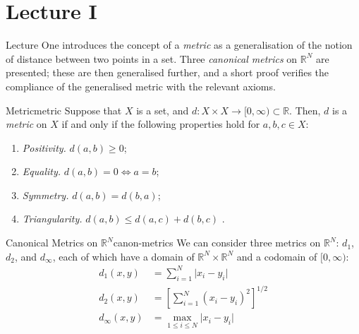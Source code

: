 \documentclass{article}
\numberwithin{equation}{section}
\numberwithin{enumi}{section}
\begin{document}
\section{Lecture I}
Lecture One introduces the concept of a \emph{metric} as a generalisation of the
notion of distance between two points in a set. Three \emph{canonical metrics}
on $\mathbb{R}^N$ are presented; these are then generalised further, and a short
proof verifies the compliance of the generalised metric with the relevant
axioms.
\begin{definition}{Metric}{metric}
    Suppose that $ X $ is a set, and $ d \colon X \times X \to [0, \infty)
    \subset \mathbb{R} $. Then, $ d $ is a \emph{metric} on $ X $ if and only if
    the following properties hold for $ a, b, c \in X $:
    \begin{enumerate}
        \item \emph{Positivity.} $ d(a, b) \geq 0 $;
        \item \emph{Equality.} $ d(a, b) = 0 \iff a = b $;
        \item \emph{Symmetry.} $ d(a, b) = d(b, a) $;
        \item \emph{Triangularity.} $ d(a, b) \leq d(a, c) + d(b, c) $
            \label{itm:triangle-inequality}.
    \end{enumerate}
\end{definition}
\begin{definition}{Canonical Metrics on \texorpdfstring{$\mathbb{R}^N$}{an
        N-dimensional real vector space}}{canon-metrics}
    We can consider three metrics on $ \mathbb{R}^N $: $ d_1 $, $ d_2 $, and
    $ d_\infty $, each of which have a domain of $ \mathbb{R}^N \times
    \mathbb{R}^N $ and a codomain of $ [0, \infty) $:
    \begin{align}
        d_1(x, y) &= \sum_{i=1}^N \vert x_i - y_i \vert \\
        d_2(x, y) &= \left[\sum_{i=1}^N (x_i - y_i)^2\right]^{1/2}
            \label{eqn:d2-metric} \\[.8em]
        d_\infty(x, y) &= \max_{1 \leq i \leq N} \vert x_i - y_i \vert
    \end{align}
\end{definition}
\end{document}

